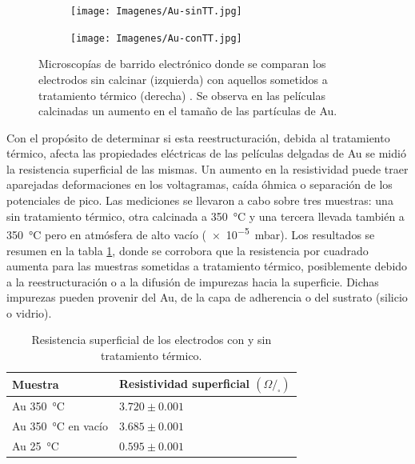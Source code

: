 			 		\begin{figure}[th]
		 	   	    \begin{subfigure}[t]{0.495\textwidth}
			       	\texttt{[image: Imagenes/Au-sinTT.jpg]}
			   		\end{subfigure}
			   		\begin{subfigure}[t]{0.495\textwidth}
			   	    \texttt{[image: Imagenes/Au-conTT.jpg]}
			   		\end{subfigure}
					 \caption[Microscopía comparativa electrodos Au]{Microscopías de barrido electrónico donde se comparan los electrodos sin calcinar (izquierda) con aquellos sometidos a tratamiento térmico (derecha) . Se observa en las películas calcinadas un aumento en el tamaño de las partículas de Au.}
					 \label{fig:Au_compTT}	
				     \end{figure}	

		     \vspace{2mm}Con el propósito de determinar si esta reestructuración, debida al tratamiento térmico,  afecta las propiedades eléctricas de las películas delgadas de Au se midió la resistencia superficial de las mismas. Un aumento en la resistividad puede traer aparejadas deformaciones en los voltagramas, caída óhmica o separación de los potenciales de pico. Las mediciones se llevaron a cabo sobre tres muestras: una sin tratamiento térmico, otra calcinada a \SI{350}{\celsius} y una tercera llevada también a \SI{350}{\celsius} pero en atmósfera de alto vacío (\SI{e-5}{\milli\bar}). Los resultados se resumen en la tabla \ref{tabla:resistencia}, donde se corrobora que la resistencia por cuadrado aumenta para las muestras sometidas a tratamiento térmico, posiblemente debido a la reestructuración o a la difusión de impurezas hacia la superficie. Dichas impurezas pueden provenir del Au, de la capa de adherencia o del sustrato (silicio o vidrio).

				\begin{table}[ht!]
			  		  \caption[Resistencia superficial de los electrodos]{Resistencia superficial de los electrodos con y sin tratamiento térmico.} 
			  		  \begin{tabular}{>{\raggedright\arraybackslash}m{4.2cm}>{\raggedright\arraybackslash}m{7.075cm}} 
			  		  \toprule
					  Muestra & Resistividad superficial $(\Omega/_{\square})$  \\ \midrule
			      	  Au \index{oro}\SI{350}{\celsius} 		  	& $3.720 \pm 0.001$		 \\	  
			      	  Au \index{oro}\SI{350}{\celsius} en vacío	& $3.685 \pm 0.001$		 \\	  
			      	  Au \index{oro}\SI{25}{\celsius}    	  		& $0.595 \pm 0.001$		 \\ 
			      	  \bottomrule
			    	  \end{tabular}
			    	  \label{tabla:resistencia}
			   		  \end{table}	
	

